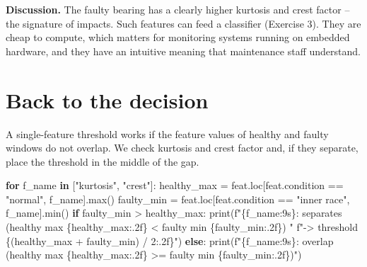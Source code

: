 \documentclass[
  letterpaper,
  DIV=11,
  numbers=noendperiod]{scrreprt}
\newenvironment{Shaded}{\begin{snugshade}}{\end{snugshade}}
\newcommand{\BuiltInTok}[1]{\textcolor[rgb]{0.00,0.23,0.31}{#1}}
\newcommand{\ControlFlowTok}[1]{\textcolor[rgb]{0.00,0.23,0.31}{\textbf{#1}}}
\newcommand{\DecValTok}[1]{\textcolor[rgb]{0.68,0.00,0.00}{#1}}
\newcommand{\KeywordTok}[1]{\textcolor[rgb]{0.00,0.23,0.31}{\textbf{#1}}}
\newcommand{\NormalTok}[1]{\textcolor[rgb]{0.00,0.23,0.31}{#1}}
\newcommand{\OperatorTok}[1]{\textcolor[rgb]{0.37,0.37,0.37}{#1}}
\newcommand{\SpecialCharTok}[1]{\textcolor[rgb]{0.37,0.37,0.37}{#1}}
\newcommand{\SpecialStringTok}[1]{\textcolor[rgb]{0.13,0.47,0.30}{#1}}
\newcommand{\StringTok}[1]{\textcolor[rgb]{0.13,0.47,0.30}{#1}}
\begin{document}
\textbf{Discussion.} The faulty bearing has a clearly higher kurtosis
and crest factor -- the signature of impacts. Such features can feed a
classifier (Exercise 3). They are cheap to compute, which matters for
monitoring systems running on embedded hardware, and they have an
intuitive meaning that maintenance staff understand.

\section{Back to the decision}\label{back-to-the-decision-9}

A single-feature threshold works if the feature values of healthy and
faulty windows do not overlap. We check kurtosis and crest factor and,
if they separate, place the threshold in the middle of the gap.

\begin{Shaded}
\begin{Highlighting}[]
\ControlFlowTok{for}\NormalTok{ f\_name }\KeywordTok{in}\NormalTok{ [}\StringTok{"kurtosis"}\NormalTok{, }\StringTok{"crest"}\NormalTok{]:}
\NormalTok{    healthy\_max }\OperatorTok{=}\NormalTok{ feat.loc[feat.condition }\OperatorTok{==} \StringTok{"normal"}\NormalTok{, f\_name].}\BuiltInTok{max}\NormalTok{()}
\NormalTok{    faulty\_min }\OperatorTok{=}\NormalTok{ feat.loc[feat.condition }\OperatorTok{==} \StringTok{"inner race"}\NormalTok{, f\_name].}\BuiltInTok{min}\NormalTok{()}
    \ControlFlowTok{if}\NormalTok{ faulty\_min }\OperatorTok{\textgreater{}}\NormalTok{ healthy\_max:}
        \BuiltInTok{print}\NormalTok{(}\SpecialStringTok{f"}\SpecialCharTok{\{}\NormalTok{f\_name}\SpecialCharTok{:9s\}}\SpecialStringTok{: separates (healthy max }\SpecialCharTok{\{}\NormalTok{healthy\_max}\SpecialCharTok{:.2f\}}\SpecialStringTok{ \textless{} faulty min }\SpecialCharTok{\{}\NormalTok{faulty\_min}\SpecialCharTok{:.2f\}}\SpecialStringTok{) "}
              \SpecialStringTok{f"{-}\textgreater{} threshold }\SpecialCharTok{\{}\NormalTok{(healthy\_max }\OperatorTok{+}\NormalTok{ faulty\_min) }\OperatorTok{/} \DecValTok{2}\SpecialCharTok{:.2f\}}\SpecialStringTok{"}\NormalTok{)}
    \ControlFlowTok{else}\NormalTok{:}
        \BuiltInTok{print}\NormalTok{(}\SpecialStringTok{f"}\SpecialCharTok{\{}\NormalTok{f\_name}\SpecialCharTok{:9s\}}\SpecialStringTok{: overlap (healthy max }\SpecialCharTok{\{}\NormalTok{healthy\_max}\SpecialCharTok{:.2f\}}\SpecialStringTok{ \textgreater{}= faulty min }\SpecialCharTok{\{}\NormalTok{faulty\_min}\SpecialCharTok{:.2f\}}\SpecialStringTok{)"}\NormalTok{)}
\end{Highlighting}
\end{Shaded}
\end{document}
